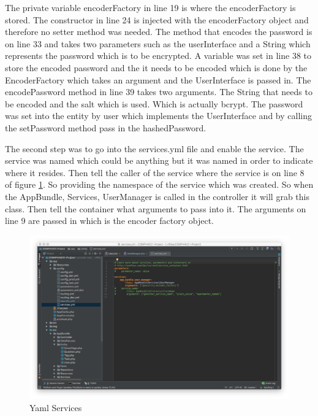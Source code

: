 The private variable encoderFactory in line 19 is where the encoderFactory is stored. The constructor in line 24 is injected with the encoderFactory object and therefore no setter method was needed. The method that encodes the password is on line 33 and takes two parameters such as the userInterface and a String which represents the password which is to be encrypted. A variable was set in line 38 to store the encoded password and the it needs to be encoded which is done by the EncoderFactory which takes an argument and the UserInterface is passed in. The encodePassword method in line 39 takes two arguments. The String that needs to be encoded and the salt which is used. Which is actually bcrypt. The password was set into the entity by user which implements the UserInterface and by calling the setPassword method pass in the hashedPassword.

The second step was to go into the services.yml file and enable the service. The service was named which could be anything but it was named in order to indicate where it resides. Then tell the caller of the service where the service is on line 8 of figure \ref{fig:Yaml Services}. So providing the namespace of the service which was created. So when the AppBundle, Services, UserManager is called in the controller it will grab this class. Then tell the container what arguments to pass into it. The arguments on line 9 are passed in which is the encoder factory object.

\begin{figure}[htbp]
   \centering
   \includegraphics[width=400pt]{figures/services_yml.png} %
   \caption{Yaml Services}
   \label{fig:Yaml Services}
\end{figure}

